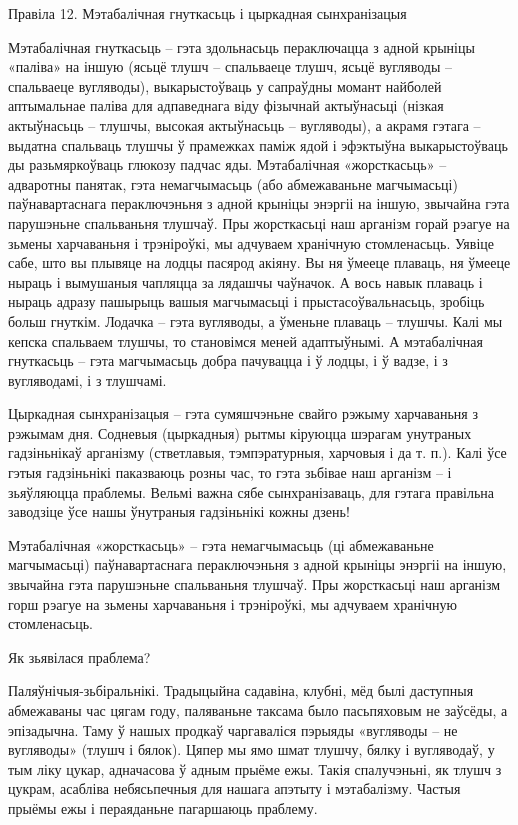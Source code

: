 Правіла 12. Мэтабалічная гнуткасьць і цыркадная сынхранізацыя

Мэтабалічная гнуткасьць – гэта здольнасьць пераключацца з адной крыніцы «паліва» на іншую (ясьцё тлушч – спальваеце тлушч, ясьцё вугляводы – спальваеце вугляводы), выкарыстоўваць у сапраўдны момант найболей аптымальнае паліва для адпаведнага віду фізычнай актыўнасьці (нізкая актыўнасьць – тлушчы, высокая актыўнасьць – вугляводы), а акрамя гэтага – выдатна спальваць тлушчы ў прамежках паміж ядой і эфэктыўна выкарыстоўваць ды разьмяркоўваць глюкозу падчас яды.
Мэтабалічная «жорсткасьць» – адваротны панятак, гэта немагчымасьць (або абмежаваньне магчымасьці) паўнавартаснага пераключэньня з адной крыніцы энэргіі на іншую, звычайна гэта парушэньне спальваньня тлушчаў. Пры жорсткасьці наш арганізм горай рэагуе на зьмены харчаваньня і трэніроўкі, мы адчуваем хранічную стомленасьць.
Уявіце сабе, што вы плывяце на лодцы пасярод акіяну. Вы ня ўмееце плаваць, ня ўмееце ныраць і вымушаныя чапляцца за лядашчы чаўначок. А вось навык плаваць і ныраць адразу пашырыць вашыя магчымасьці і прыстасоўвальнасьць, зробіць больш гнуткім. Лодачка – гэта вугляводы, а ўменьне плаваць – тлушчы. Калі мы кепска спальваем тлушчы, то становімся меней адаптыўнымі. А мэтабалічная гнуткасьць – гэта магчымасьць добра пачувацца і ў лодцы, і ў вадзе, і з вугляводамі, і з тлушчамі.

Цыркадная сынхранізацыя – гэта сумяшчэньне свайго рэжыму харчаваньня з рэжымам дня. Содневыя (цыркадныя) рытмы кіруюцца шэрагам унутраных гадзіньнікаў арганізму (стветлавыя, тэмпэратурныя, харчовыя і да т. п.). Калі ўсе гэтыя гадзіньнікі паказваюць розны час, то гэта зьбівае наш арганізм – і зьяўляюцца праблемы. Вельмі важна сябе сынхранізаваць, для гэтага правільна заводзіце ўсе нашы ўнутраныя гадзіньнікі кожны дзень!

Мэтабалічная «жорсткасьць» – гэта немагчымасьць (ці абмежаваньне магчымасьці) паўнавартаснага пераключэньня з адной крыніцы энэргіі на іншую, звычайна гэта парушэньне спальваньня тлушчаў. Пры жорсткасьці наш арганізм горш рэагуе на зьмены харчаваньня і трэніроўкі, мы адчуваем хранічную стомленасьць.

Як зьявілася праблема?

Паляўнічыя-зьбіральнікі.
Традыцыйна садавіна, клубні, мёд былі даступныя абмежаваны час цягам году, паляваньне таксама было пасьпяховым не заўсёды, а эпізадычна. Таму ў нашых продкаў чаргаваліся пэрыяды «вугляводы – не вугляводы» (тлушч і бялок). Цяпер мы ямо шмат тлушчу, бялку і вугляводаў, у тым ліку цукар, адначасова ў адным прыёме ежы. Такія спалучэньні, як тлушч з цукрам, асабліва небясьпечныя для нашага апэтыту і мэтабалізму. Частыя прыёмы ежы і пераяданьне пагаршаюць праблему.

